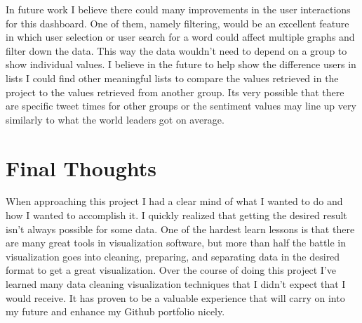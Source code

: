 \documentclass[journal]{vgtc}                %
\begin{document}
In future work I believe there could many improvements in the user interactions for this dashboard.
One of them, namely filtering, would be an excellent feature in which user selection or user search for a word could affect multiple graphs and filter down the data.
This way the data wouldn't need to depend on a group to show individual values.
I believe in the future to help show the difference users in lists I could find other meaningful lists to compare the values retrieved in the project to the values retrieved from another group.
Its very possible that there are specific tweet times for other groups or the sentiment values may line up very similarly to what the world leaders got on average. 

\section*{Final Thoughts}

When approaching this project I had a clear mind of what I wanted to do and how I wanted to accomplish it.
I quickly realized that getting the desired result isn't always possible for some data.
One of the hardest learn lessons is that there are many great tools in visualization software, but more than half the battle in visualization goes into cleaning, preparing, and separating data in the desired format to get a great visualization.
Over the course of doing this project I've learned many data cleaning visualization techniques that I didn't expect that I would receive.
It has proven to be a valuable experience that will carry on into my future and enhance my Github portfolio nicely.



\end{document}
